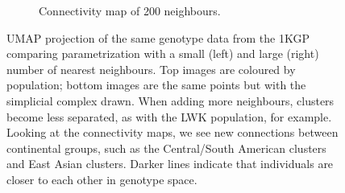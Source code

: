 \documentclass[12pt]{article}
\begin{document}
\begin{figure}[h!]
\begin{subfigure}[b]{0.48\linewidth}
    \caption{Connectivity map of 200 neighbours.}
    \label{fig:UMAP_high_NN_connectivity}
  \end{subfigure}
  \caption{UMAP projection of the same genotype data from the 1KGP comparing parametrization with a small (left) and large (right) number of nearest neighbours. Top images are coloured by population; bottom images are the same points but with the simplicial complex drawn. When adding more neighbours, clusters become less separated, as with the LWK population, for example. Looking at the connectivity maps, we see new connections between continental groups, such as the Central/South American clusters and East Asian clusters. Darker lines indicate that individuals are closer to each other in genotype space.}
  \label{fig:UMAP_connectivity}
\end{figure}

\clearpage
\newpage




\end{document}
